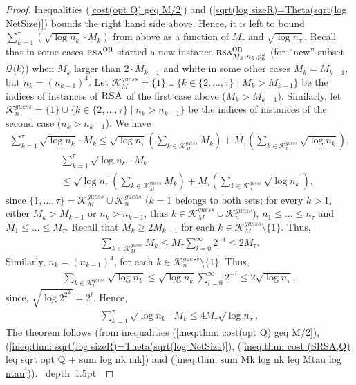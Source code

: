 \documentclass[11pt]{article}
\def\blackslug{\hbox{\hskip 1pt \vrule width 4pt height 8pt
    depth 1.5pt \hskip 1pt}}
\def\QED{\quad\blackslug\lower 8.5pt\null\par}
\newcommand{\RSA}{\mbox{\sc RSA}}
\newcommand{\lrangle}[1]{\langle #1\rangle}
\newcommand{\calQ}{\mathcal{Q}}
\newcommand{\calK}{\mathcal{K}}
\newcommand{\onRSAmnk}[1]{\mbox{\sc rsa}^{\mbox{\upshape on}}_{\MM_{#1},\nn_{#1},p_0^{#1}}}
\newcommand{\onRSA}{\mbox{\sc rsa}^{\mbox{\upshape on}}}
\newcommand{\MM}[0]{M}
\newcommand{\nn}{n}
\begin{document}
{\begin{proof}
Inequalities (\ref{cost(opt Q) geq M/2}) and (\ref{sqrt(log sizeR)=Theta(sqrt(log NetSize)})
bounds the right hand side above. Hence,
it is left to bound $\sum_{k=1}^{\tau}(\sqrt{\log \nn_k}\cdot\MM_k)$ from above  as a function of $\MM_\tau$ and $\sqrt{\log \nn_\tau}$.
Recall that in some cases $\onRSA$ started a new instance $\onRSAmnk{k}$ (for ``new'' subset $\calQ\lrangle{k}$)
when $\MM_k$ larger than $2\cdot{\MM_{k-1}}$ and white in some other cases $\MM_k=\MM_{k-1}$, but $\nn_k=(\nn_{k-1})^4$.
Let $\calK_{\MM}^{guess}=\{1\}\cup\{k\in\{2,...,\tau\} \mid \MM_k>\MM_{k-1}\}$ be the indices
of instances of $\RSA$ of the first case above ($\MM_k>\MM_{k-1}$).
Similarly, let $\calK_{\nn}^{guess}=\{1\}\cup\{k\in\{2,...,\tau\} \mid \nn_k>\nn_{k-1}\}$
be the indices of instances of the second case ($\nn_k>\nn_{k-1}$).
We have
\commsingle
\begin{eqnarray*}
\sum_{k=1}^{\tau}\sqrt{\log \nn_k}\cdot\MM_k \leq
\sqrt{\log \nn_\tau}\left(\sum_{k\in\calK_{\MM}^{guess}}\MM_k \right)
+
\MM_\tau\left(\sum_{k\in\calK_{\nn}^{guess}}\sqrt{\log \nn_k}\right),
\end{eqnarray*}
\commsingleend
\commdouble
\begin{eqnarray*}
&&\sum_{k=1}^{\tau}\sqrt{\log \nn_k}\cdot\MM_k\\
&& \leq
\sqrt{\log \nn_\tau}\left(\sum_{k\in\calK_{\MM}^{guess}}\MM_k \right)
+
\MM_\tau\left(\sum_{k\in\calK_{\nn}^{guess}}\sqrt{\log \nn_k}\right),
\end{eqnarray*}
\commdoubleend
since $\{1,...,\tau\}= \calK_{\MM}^{guess}\cup\calK_{\nn}^{guess}$
($k=1$ belongs to both sets; for every $k>1$, either $\MM_k>\MM_{k-1}$ or $\nn_k>\nn_{k-1}$, thus $k\in\calK_{\MM}^{guess}\cup\calK_{\nn}^{guess}$),
$\nn_1\leq...\leq \nn_{\tau}$ and $\MM_1\leq...\leq \MM_{\tau}$.
Recall that $\MM_{k}\geq2\MM_{k-1}$ for each $k\in\calK_{\MM}^{guess}\setminus\{1\}$.
Thus,
\begin{eqnarray*}
\sum_{k\in\calK_{\MM}^{guess}}\MM_k
\leq
\MM_\tau\sum_{i=0}^{ \infty} 2^{-i}\leq 2\MM_\tau.
\end{eqnarray*}
Similarly, $\nn_{k}= (\nn_{k-1})^4$, for each $k\in\calK_{\nn}^{guess}\setminus\{1\}$.
Thus,
\begin{eqnarray*}
\sum_{k\in\calK_{\nn}^{guess}}\sqrt{\log \nn_k}
\leq
\sqrt{\log \nn_k}\sum_{i=0}^{\infty}2^{-i}
\leq
2\sqrt{\log n_\tau},
\label{ineq: tetartion: sum sqrt log tetartion}
\end{eqnarray*}
since, $\sqrt{\log 2^{2^{2l}}}=2^l$.
Hence,
\begin{eqnarray}
\sum_{k=1}^{\tau}\sqrt{\log \nn_k}\cdot\MM_k \leq 4\MM_\tau\sqrt{\log \nn_\tau},
\label{ineq:thm: sum Mk log nk leq Mtau log ntau}
\end{eqnarray}
The theorem follows (from inequalities
(\ref{ineq:thm: cost(opt Q) geq M/2}), (\ref{ineq:thm: sqrt(log sizeR)=Theta(sqrt(log NetSize)}),
(\ref{ineq:thm: cost (SRSA,Q) leq sqrt opt Q + sum log nk mk})
and (\ref{ineq:thm: sum Mk log nk leq Mtau log ntau})).
\QED\end{proof}
} 
\end{document}

